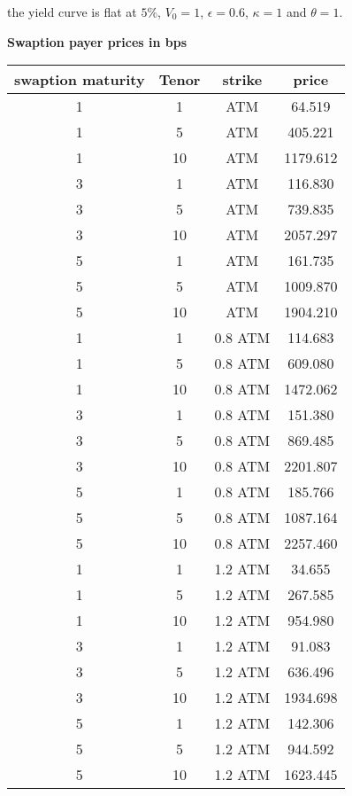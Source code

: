 the yield curve is flat at $5\%$, $V_0=1$, $\epsilon=0.6$, $\kappa=1$ and $\theta=1$.
\begin{center}
{\bf Swaption payer prices in bps}\\
\begin{tabular}{|cccc|}\hline
{\small swaption maturity}  & Tenor     & strike      &   price   \\ \hline
  1      &  1    &    ATM   &  64.519   \\  
  1      &  5    &    ATM   &  405.221    \\
  1      &  10   &    ATM   &  1179.612    \\
  3      &  1    &    ATM   &  116.830   \\  
  3      &  5    &    ATM   &  739.835    \\
  3      &  10   &    ATM   &  2057.297     \\
  5      &  1    &    ATM   &   161.735  \\  
  5      &  5    &    ATM   &   1009.870 \\
  5      &  10   &    ATM   &   1904.210  \\ \hline
  1      &  1    &    0.8 ATM   &   114.683  \\  
  1      &  5    &    0.8 ATM   &    609.080 \\
  1      &  10   &    0.8 ATM   &    1472.062  \\
  3      &  1    &    0.8 ATM   &    151.380 \\  
  3      &  5    &    0.8 ATM   &    869.485 \\
  3      &  10   &    0.8 ATM   &    2201.807  \\
  5      &  1    &    0.8 ATM   &    185.766 \\  
  5      &  5    &    0.8 ATM   &    1087.164 \\
  5      &  10   &    0.8 ATM   &    2257.460  \\ \hline
  1      &  1    &    1.2 ATM   &    34.655 \\  
  1      &  5    &    1.2 ATM   &    267.585 \\
  1      &  10   &    1.2 ATM   &    954.980  \\
  3      &  1    &    1.2 ATM   &    91.083 \\  
  3      &  5    &    1.2 ATM   &    636.496 \\
  3      &  10   &    1.2 ATM   &    1934.698  \\
  5      &  1    &    1.2 ATM   &    142.306  \\  
  5      &  5    &    1.2 ATM   &    944.592 \\
  5      &  10   &    1.2 ATM   &    1623.445  \\ \hline
\end{tabular} 
\end{center} 


